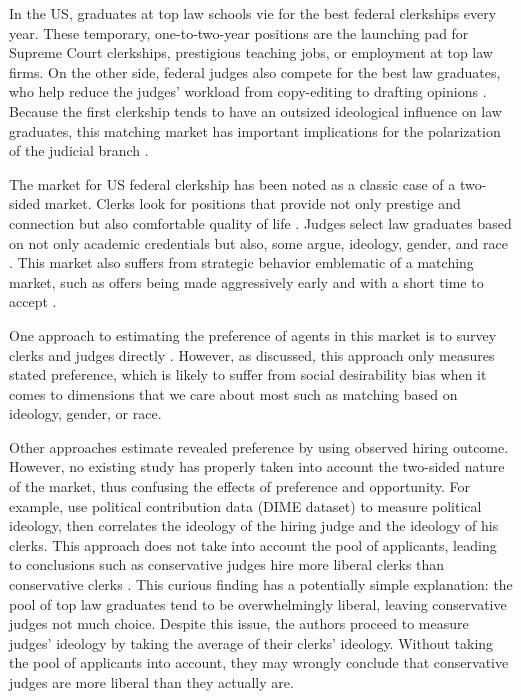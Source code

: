 In the US, graduates at top law schools vie for the best federal clerkships
every year. These temporary, one-to-two-year positions are the launching pad for
Supreme Court clerkships, prestigious teaching jobs, or employment at top law
firms. On the other side, federal judges also compete for the best law
graduates, who help reduce the judges' workload from copy-editing to drafting
opinions \citep{Gulati2016, Posner2001}. Because the first clerkship tends to
have an outsized ideological influence on law graduates, this matching market
has important implications for the polarization of the judicial branch
\citep{Ditslear2001, Liptak2007}.

The market for US federal clerkship has been noted as a classic case of a
two-sided market. Clerks look for positions that provide not only prestige and
connection but also comfortable quality of life \citep{Posner2001}. Judges
select law graduates based on not only academic credentials but also, some
argue, ideology, gender, and race \citep{Slotnick1984}. This market also suffers
from strategic behavior emblematic of a matching market, such as offers being
made aggressively early and with a short time to accept \citep{Posner2001,
  Posner2007}.

One approach to estimating the preference of agents in this market is to survey
clerks and judges directly \citep{Peppers2008}. However, as discussed, this
approach only measures stated preference, which is likely to suffer from social
desirability bias when it comes to dimensions that we care about most such as
matching based on ideology, gender, or race.

Other approaches estimate revealed preference by using observed hiring outcome.
However, no existing study has properly taken into account the two-sided nature
of the market, thus confusing the effects of preference and opportunity. For
example, \citet{Bonica2017} use political contribution data (DIME dataset) to
measure political ideology, then correlates the ideology of the hiring judge and
the ideology of his clerks. This approach does not take into account the pool of
applicants, leading to conclusions such as conservative judges hire more liberal
clerks than conservative clerks \citep[31]{Bonica2017}. This curious finding has
a potentially simple explanation: the pool of top law graduates tend to be
overwhelmingly liberal, leaving conservative judges not much choice. Despite
this issue, the authors proceed to measure judges' ideology by taking the
average of their clerks' ideology. Without taking the pool of applicants into
account, they may wrongly conclude that conservative judges are more liberal
than they actually are.

